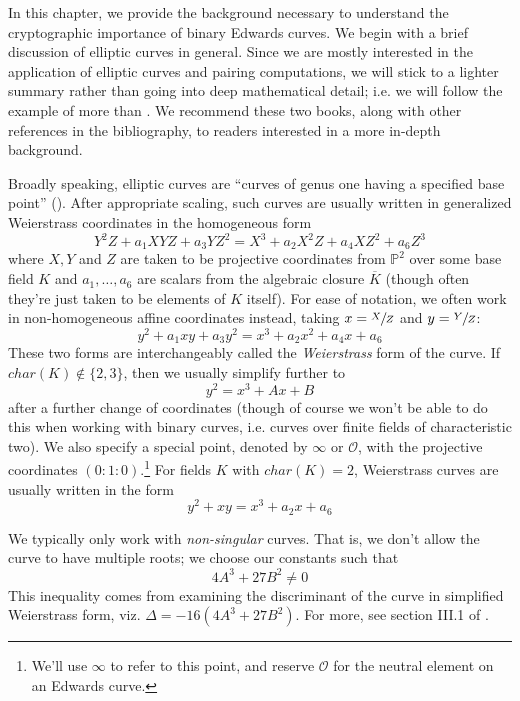 \label{chp:back}

In this chapter, we provide the background necessary to understand the
    cryptographic importance of binary Edwards curves.
We begin with a brief discussion of elliptic curves in general.
Since we are mostly interested in the application of elliptic curves and
    pairing computations, we will stick to a lighter summary rather than going
    into deep mathematical detail; i.e. we will follow the example of
    \cite{washington2008elliptic} more than \cite{silverman2009arithmetic}.
We recommend these two books, along with other references in the bibliography,
    to readers interested in a more in-depth background.





Broadly speaking, elliptic curves are ``curves of genus one having a specified
    base point'' (\cite{silverman2009arithmetic}).
After appropriate scaling, such curves are usually written in generalized
    Weierstrass coordinates in the homogeneous form
\[
Y^2Z + a_1XYZ + a_3YZ^2 = X^3 + a_2X^2Z + a_4XZ^2 + a_6Z^3
\]
    where $X, Y$ and $Z$ are taken to be projective coordinates from
    $\mathbb{P}^2$ over some base field $K$ and $a_1, \ldots, a_6$ are
    scalars from the algebraic closure $\overline{K}$ (though often they're
    just taken to be elements of $K$ itself).
For ease of notation, we often work in non-homogeneous affine coordinates
    instead, taking $x = \sfrac{X}{Z}$ and $y = \sfrac{Y}{Z}$:
\[
y^2 + a_1xy + a_3y^2 = x^3 + a_2x^2 + a_4x + a_6
\]
These two forms are interchangeably called the \textit{Weierstrass} form of the
    curve.
If $char(K) \notin \{2, 3\}$, then we usually simplify further to
\[
y^2 = x^3 + Ax + B
\]
    after a further change of coordinates (though of course we won't be able to
    do this when working with binary curves, i.e. curves over finite fields of
    characteristic two).
We also specify a special point, denoted by $\infty$ or $\mathcal{O}$, with the
    projective coordinates $(0 : 1 : 0)$.\footnote{We'll use $\infty$ to refer
    to this point, and reserve $\mathcal{O}$ for the neutral element on an
    Edwards curve.}
For fields $K$ with $char(K) = 2$, Weierstrass curves are usually written in
    the form
\[
y^2 + xy = x^3 + a_2x + a_6
\]

We typically only work with \textit{non-singular} curves.
That is, we don't allow the curve to have multiple roots; we choose our
    constants such that
\[
4A^3 + 27B^2 \ne 0
\]
This inequality comes from examining the discriminant of the curve in
    simplified Weierstrass form, viz. $\Delta = -16(4A^3 + 27B^2)$.
For more, see section III.1 of \cite{silverman2009arithmetic}.

